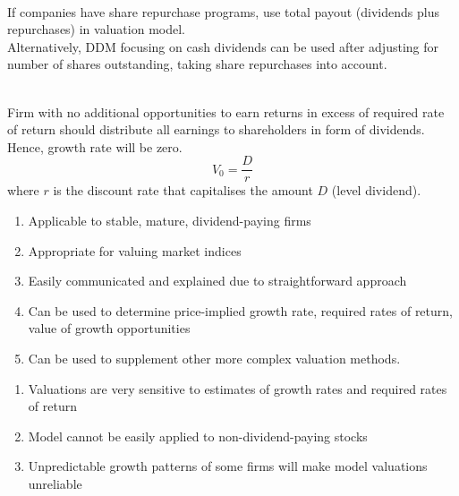 \begin{remark} \\
If companies have share repurchase programs, use total payout (dividends plus repurchases) in valuation model.\\
Alternatively, DDM focusing on cash dividends can be used after adjusting for number of shares outstanding, taking share repurchases into account.
\end{remark}

\begin{remark} \\
Firm with no additional opportunities to earn returns in excess of required rate of return should distribute all earnings to shareholders in form of dividends. Hence, growth rate will be zero.
\begin{equation}
V_0 = \frac{D}{r} \nonumber
\end{equation}
where $r$ is the discount rate that capitalises the amount $D$ (level dividend).
\end{remark}

\begin{remark} 
\begin{enumerate}[label=\roman*.]
\setlength{\itemsep}{0pt}
\item Applicable to stable, mature, dividend-paying firms
\item Appropriate for valuing market indices
\item Easily communicated and explained due to straightforward approach
\item Can be used to determine price-implied growth rate, required rates of return, value of growth opportunities
\item Can be used to supplement other more complex valuation methods.
\end{enumerate}
\end{remark}

\begin{remark} 
\begin{enumerate}[label=\roman*.]
\setlength{\itemsep}{0pt}
\item Valuations are very sensitive to estimates of growth rates and required rates of return
\item Model cannot be easily applied to non-dividend-paying stocks
\item Unpredictable growth patterns of some firms will make model valuations unreliable
\end{enumerate}
\end{remark}

